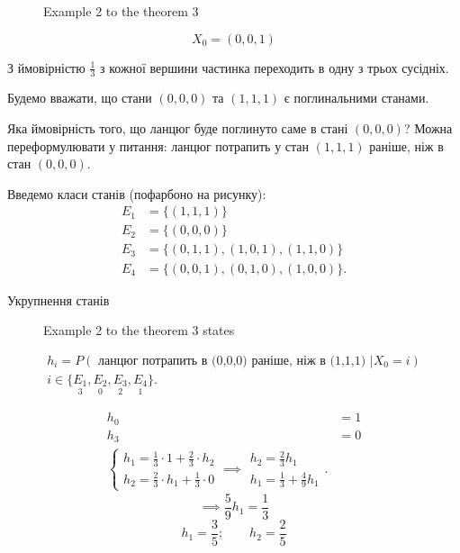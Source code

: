 \begin{example}
\begin{figure}[ht]
    \centering
    \caption{Example 2 to the theorem 3}
    \label{fig:example-2-to-the-theorem-3}
\end{figure}
\[ X_0 = (0, 0, 1) \] 

З ймовірністю $\frac{1}{3}$ з кожної вершини частинка переходить в одну з трьох сусідніх.

Будемо вважати, що стани $(0,0,0)$ та $(1,1,1)$ є поглинальними станами.

Яка ймовірність того, що ланцюг буде поглинуто саме в стані $(0,0,0)$?
Можна переформулювати у питання: ланцюг потрапить у стан $(1,1,1)$ раніше, ніж в стан $(0,0,0)$.

Введемо класи станів (пофарбоно на рисунку):
\begin{align*}
  E_1 &= \{(1,1,1)\} \\
  E_2 &= \{(0,0,0)\} \\
  E_3 &= \{(0,1,1),(1,0,1),(1,1,0)\} \\
  E_4 &= \{(0,0,1),(0,1,0),(1,0,0)\} 
.\end{align*}

Укрупнення станів
\begin{figure}[ht]
    \centering
    \caption{Example 2 to the theorem 3 states}
    \label{fig:example-2-to-the-theorem-3-states}
\end{figure}

\begin{align*}
  h_i = P\left( \text{ ланцюг потрапить в (0,0,0) раніше, ніж в (1,1,1) } | X_0=i \right) \\
  i \in  \{ \underset{3}{E_1}, \underset{0}{E_2}, \underset{2}{E_3}, \underset{1}{E_4} \} 
.\end{align*}

\begin{align*}
  h_0 &= 1 \\
  h_3 &= 0 \\
  \begin{cases}
    h_1 = \frac{1}{3} \cdot 1 + \frac{2}{3} \cdot h_2 \\
    h_2 = \frac{2}{3} \cdot h_1 + \frac{1}{3} \cdot 0
  \end{cases} \implies 
  \begin{matrix}
    h_2 = \frac{2}{3} h_1 \\
    h_1 = \frac{1}{3} + \frac{4}{9}h_1 
  \end{matrix}
.\end{align*}
\[ \implies \frac{5}{9} h_1 = \frac{1}{3} \] 
\[ h_1 = \frac{3}{5}; \qquad h_2 = \frac{2}{5} \] 
\end{example}


